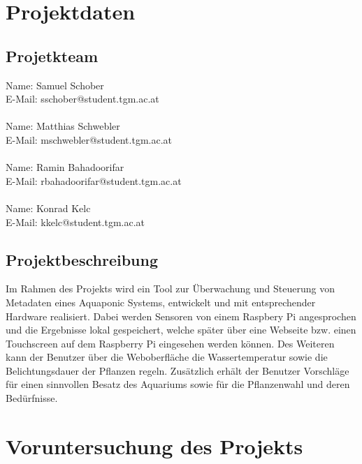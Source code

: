 \documentclass[11pt]{article}
\begin{document}
\section{Projektdaten}

\subsection{Projetkteam}
Name: Samuel Schober \\
E-Mail: sschober@student.tgm.ac.at \\
\\Name: Matthias Schwebler \\
E-Mail: mschwebler@student.tgm.ac.at \\
\\Name: Ramin Bahadoorifar \\
E-Mail: rbahadoorifar@student.tgm.ac.at \\
\\Name: Konrad Kelc \\
E-Mail: kkelc@student.tgm.ac.at

\subsection{Projektbeschreibung}
Im Rahmen des Projekts wird ein Tool zur \"Uberwachung und Steuerung von Metadaten eines Aquaponic Systems, entwickelt und mit entsprechender Hardware realisiert. Dabei werden Sensoren von einem Raspbery Pi angesprochen und die Ergebnisse lokal gespeichert, welche sp\"ater \"uber eine Webseite bzw. einen Touchscreen auf dem Raspberry Pi eingesehen werden k\"onnen. Des Weiteren kann der Benutzer \"uber die Weboberfl\"ache die Wassertemperatur sowie die Belichtungsdauer der Pflanzen regeln. Zus\"atzlich erh\"alt der Benutzer Vorschl\"age f\"ur einen sinnvollen Besatz des Aquariums sowie f\"ur die Pflanzenwahl und deren Bed\"urfnisse.

\section{Voruntersuchung des Projekts}
\end{document}
